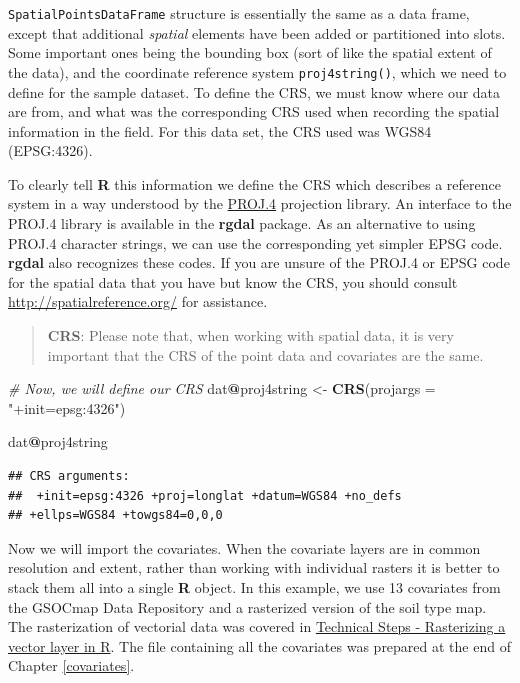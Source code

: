 \documentclass[10pt,b5paper,]{book}
\newenvironment{Shaded}{\begin{snugshade}}{\end{snugshade}}
\newcommand{\CommentTok}[1]{\textcolor[rgb]{0.56,0.35,0.01}{\textit{#1}}}
\newcommand{\DataTypeTok}[1]{\textcolor[rgb]{0.13,0.29,0.53}{#1}}
\newcommand{\KeywordTok}[1]{\textcolor[rgb]{0.13,0.29,0.53}{\textbf{#1}}}
\newcommand{\NormalTok}[1]{#1}
\newcommand{\OperatorTok}[1]{\textcolor[rgb]{0.81,0.36,0.00}{\textbf{#1}}}
\newcommand{\StringTok}[1]{\textcolor[rgb]{0.31,0.60,0.02}{#1}}
\theoremstyle{definition}
\theoremstyle{definition}
\theoremstyle{definition}
\theoremstyle{remark}
\begin{document}
\texttt{SpatialPointsDataFrame} structure is essentially the same as a
data frame, except that additional \emph{spatial} elements have been
added or partitioned into slots. Some important ones being the bounding
box (sort of like the spatial extent of the data), and the coordinate
reference system \texttt{proj4string()}, which we need to define for the
sample dataset. To define the CRS, we must know where our data are from,
and what was the corresponding CRS used when recording the spatial
information in the field. For this data set, the CRS used was WGS84
(EPSG:4326).

To clearly tell \textbf{R} this information we define the CRS which
describes a reference system in a way understood by the
\href{http://trac.osgeo.org/proj/}{PROJ.4} projection library. An
interface to the PROJ.4 library is available in the \textbf{rgdal}
package. As an alternative to using PROJ.4 character strings, we can use
the corresponding yet simpler EPSG code. \textbf{rgdal} also recognizes
these codes. If you are unsure of the PROJ.4 or EPSG code for the
spatial data that you have but know the CRS, you should consult
\url{http://spatialreference.org/} for assistance.

\begin{quote}
\textbf{CRS}: Please note that, when working with spatial data, it is
very important that the CRS of the point data and covariates are the
same.
\end{quote}

\begin{Shaded}
\begin{Highlighting}[]
\CommentTok{# Now, we will define our CRS}
\NormalTok{dat}\OperatorTok{@}\NormalTok{proj4string <-}\StringTok{ }\KeywordTok{CRS}\NormalTok{(}\DataTypeTok{projargs =} \StringTok{"+init=epsg:4326"}\NormalTok{)}

\NormalTok{dat}\OperatorTok{@}\NormalTok{proj4string}
\end{Highlighting}
\end{Shaded}

\begin{verbatim}
## CRS arguments:
##  +init=epsg:4326 +proj=longlat +datum=WGS84 +no_defs
## +ellps=WGS84 +towgs84=0,0,0
\end{verbatim}

Now we will import the covariates. When the covariate layers are in
common resolution and extent, rather than working with individual
rasters it is better to stack them all into a single \textbf{R} object.
In this example, we use 13 covariates from the GSOCmap Data Repository
and a rasterized version of the soil type map. The rasterization of
vectorial data was covered in
\protect\hyperlink{technical-steps---rasterizing-a-vector-layer-in-r}{Technical
Steps - Rasterizing a vector layer in R}. The file containing all the
covariates was prepared at the end of Chapter \ref{covariates}.
\end{document}
